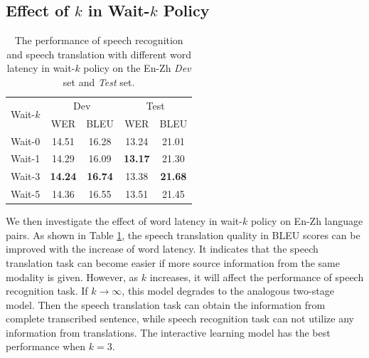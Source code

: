 \documentclass[letterpaper]{article} %
\begin{document}
\subsection{Effect of $k$ in Wait-$k$ Policy}
\label{sec:k}
\begin{table}[t]
	\centering
	\begin{tabular}{@{}l|cc|cc@{}}
		\hline
		\multirow{2}{*}{Wait-$k$} & \multicolumn{2}{c|}{Dev} & \multicolumn{2}{c}{Test} \\ 
		\multicolumn{1}{c|}{}              & WER      & BLEU     & WER      & BLEU     \\ 
		\hline
		Wait-0                                        & 14.51        & 16.28       & 13.24       & 21.01       \\
		Wait-1                                         & 14.29       & 16.09       & \textbf{13.17}       & 21.30       \\
		Wait-3                                        & \textbf{14.24}      &  \textbf{16.74}       & 13.38       & \textbf{21.68}       \\
		Wait-5                                        & 14.36       &  16.55      & 13.51       & 21.45     \\  
		\hline
	\end{tabular}
	\caption{The performance of speech recognition and speech translation with different word latency in wait-$k$ policy on the En-Zh \textit{Dev} set and \textit{Test} set.}
	\label{tbl:wait-k}
\end{table}

We then investigate the effect of word latency in wait-$k$ policy on En-Zh language pairs. As shown in Table \ref{tbl:wait-k}, the speech translation quality in BLEU scores can be improved with the increase of word latency. It indicates that the speech translation task can become easier if more source information from the same modality is given. However, as $k$ increases, it will affect the performance of speech recognition task. 
If $k \rightarrow \infty$,  this model degrades to the analogous two-stage model. Then the speech translation task can obtain the information from complete transcribed sentence, while speech recognition task can not utilize any information from translations. %
The interactive learning model has the best performance when $k=3$.  %
\end{document}
